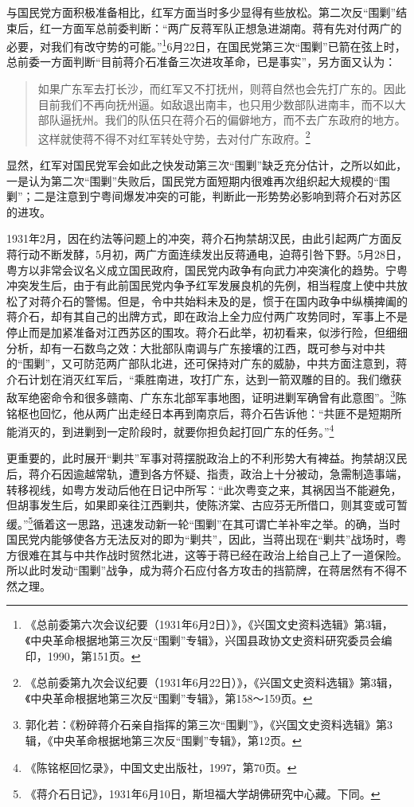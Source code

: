 与国民党方面积极准备相比，红军方面当时多少显得有些放松。第二次反“围剿”结束后，红一方面军总前委判断：“两广反蒋军队正想急进湖南。蒋有先对付两广的必要，对我们有改守势的可能。”\footnote{《总前委第六次会议纪要（1931年6月2日）》，《兴国文史资料选辑》第3辑，《中央革命根据地第三次反“围剿”专辑》，兴国县政协文史资料研究委员会编印，1990，第151页。}6月22日，在国民党第三次“围剿”已箭在弦上时，总前委一方面判断“目前蒋介石准备三次进攻革命，已是事实”，另方面又认为：

\begin{quote}

如果广东军去打长沙，而红军又不打抚州，则蒋自然也会先打广东的。因此目前我们不再向抚州逼。如敌退出南丰，也只用少数部队进南丰，而不以大部队逼抚州。我们的队伍只在蒋介石的偏僻地方，而不去广东政府的地方。这样就使蒋不得不对红军转处守势，去对付广东政府。\footnote{《总前委第九次会议纪要（1931年6月22日）》，《兴国文史资料选辑》第3辑，《中央革命根据地第三次反“围剿”专辑》，第158～159页。}
\end{quote}


显然，红军对国民党军会如此之快发动第三次“围剿”缺乏充分估计，之所以如此，一是认为第二次“围剿”失败后，国民党方面短期内很难再次组织起大规模的“围剿”；二是注意到宁粤间爆发冲突的可能，判断此一形势势必影响到蒋介石对苏区的进攻。


1931年2月，因在约法等问题上的冲突，蒋介石拘禁胡汉民，由此引起两广方面反蒋行动不断发酵，5月初，两广方面连续发出反蒋通电，迫蒋引咎下野。5月28日，粤方以非常会议名义成立国民政府，国民党内政争有向武力冲突演化的趋势。宁粤冲突发生后，由于有此前国民党内争予红军发展良机的先例，相当程度上使中共放松了对蒋介石的警惕。但是，令中共始料未及的是，惯于在国内政争中纵横捭阖的蒋介石，却有其自己的出牌方式，即在政治上全力应付两广攻势同时，军事上不是停止而是加紧准备对江西苏区的围攻。蒋介石此举，初初看来，似涉行险，但细细分析，却有一石数鸟之效：大批部队南调与广东接壤的江西，既可参与对中共的“围剿”，又可防范两广部队北进，还可保持对广东的威胁，中共方面注意到，蒋介石计划在消灭红军后，“乘胜南进，攻打广东，达到一箭双雕的目的。我们缴获敌军绝密命令和很多赣南、广东东北部军事地图，证明进剿军确曾有此意图”。\footnote{郭化若：《粉碎蒋介石亲自指挥的第三次“围剿”》，《兴国文史资料选辑》第3辑，《中央革命根据地第三次反“围剿”专辑》，第12页。}陈铭枢也回忆，他从两广出走经日本再到南京后，蒋介石告诉他：“共匪不是短期所能消灭的，到进剿到一定阶段时，就要你担负起打回广东的任务。”\footnote{《陈铭枢回忆录》，中国文史出版社，1997，第70页。}


更重要的，此时展开“剿共”军事对蒋摆脱政治上的不利形势大有裨益。拘禁胡汉民后，蒋介石因逾越常轨，遭到各方怀疑、指责，政治上十分被动，急需制造事端，转移视线，如粤方发动后他在日记中所写：“此次粤变之来，其祸因当不能避免，但胡事发生后，如果即亲往江西剿共，使陈济棠、古应芬无所借口，则其变或可暂缓。”\footnote{《蒋介石日记》，1931年6月10日，斯坦福大学胡佛研究中心藏。下同。}循着这一思路，迅速发动新一轮“围剿”在其可谓亡羊补牢之举。的确，当时国民党内能够使各方无法反对的即为“剿共”，因此，当蒋出现在“剿共”战场时，粤方很难在其与中共作战时贸然北进，这等于蒋已经在政治上给自己上了一道保险。所以此时发动“围剿”战争，成为蒋介石应付各方攻击的挡箭牌，在蒋居然有不得不然之理。


